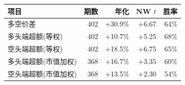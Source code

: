 \begin{tabular}{@{}lrrrr@{}}
\toprule
项目 & 期数 & 年化 & NW $t$ & 胜率 \\
\midrule
多空价差 & 402 & +30.9\% & +6.67 & 64\% \\
多头端超额(等权) & 402 & +10.7\% & +5.25 & 68\% \\
空头端超额(等权) & 402 & +18.5\% & +6.75 & 65\% \\
多头端超额(市值加权) & 368 & +16.7\% & +3.35 & 60\% \\
空头端超额(市值加权) & 368 & +13.5\% & +2.30 & 54\% \\
\bottomrule
\end{tabular}
